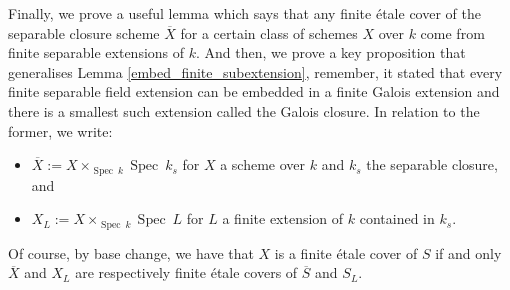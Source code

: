 \documentclass{article}
\theoremstyle{plain}
\theoremstyle{definition}
\DeclareMathOperator{\Spec}{Spec}
\begin{document}
\noindent Finally, we prove a useful lemma which says that any finite \'etale cover of the separable closure scheme $\overline{X}$ for a certain class of schemes $X$ over $k$ come from finite separable extensions of $k$.
And then, we prove a key proposition that generalises Lemma \ref{embed_finite_subextension}, remember, it stated that every finite separable field extension can be embedded in a finite Galois extension and there is a smallest such extension called the Galois closure. In relation to the former, we write:
\begin{itemize}
    \item[]$\overline{X}:= X\times_{\Spec\:k}\Spec\:k_s$ for $X$ a scheme over $k$ and $k_s$ the separable closure, and
    \item[] $X_L:= X\times_{\Spec\:k}\Spec \:L$ for $L$ a finite extension of $k$ contained in $k_s$.
\end{itemize}
\noindent Of course, by base change, we have that $X$ is a finite \'etale cover of $S$ if and only $\overline{X}$ and $X_L$ are respectively finite \'etale covers of $\overline{S}$ and $S_L$. 
\end{document}
